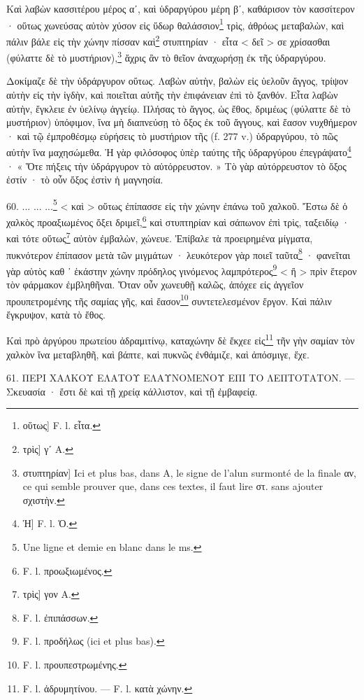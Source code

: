 \documentclass[a4paper, 11pt, oneside, polutonikogreek, french]{article}
\begin{document}
Καὶ λαβὼν κασσιτέρου μέρος αʹ, καὶ ὑδραργύρου μέρη βʹ, καθάρισον τὸν κασσίτερον · οὕτως χωνεύσας αὐτὸν χύσον εἰς ὕδωρ θαλάσσιον\footnote{οὕτως] F. l. εἶτα.} τρὶς, ἀθρόως μεταβαλὼν, καὶ πάλιν βάλε εἰς τὴν χώνην πίσσαν καὶ\footnote{τρὶς] γʹ A.} στυπτηρίαν · εἶτα < δεῖ > σε χρίσασθαι (φύλαττε δὲ τὸ μυστήριον),\footnote{στυπτηρίαν] Ici et plus bas, dans A, le signe de l'alun surmonté de la finale αν, ce qui semble prouver que, dans ces textes, il faut lire στ. sans ajouter σχιστὴν.} ἄχρις ἂν τὸ θεῖον ἀναχωρήσῃ ἐκ τῆς ὑδραργύρου.

Δοκίμαζε δὲ τὴν ὑδράργυρον οὕτως. Λαβὼν αὐτὴν, βαλὼν εἰς ὑελοῦν ἄγγος, τρίψον αὐτὴν εἰς τὴν ἰγδὴν, καὶ ποιεῖται αὐτῆς τὴν ἐπιφάνειαν ἐπὶ τὸ ξανθόν. Εἶτα λαβὼν αὐτὴν, ἔγκλειε ἐν ὑελίνῳ ἀγγείῳ. Πλήσας τὸ ἄγγος, ὡς ἔθος, δριμέως (φύλαττε δὲ τὸ μυστήριον) ὑπόφιμον, ἵνα μὴ διαπνεύσῃ τὸ ὄξος ἐκ τοῦ ἄγγους, καὶ ἔασον νυχθήμερον · καὶ τῷ ἐμπροθέσμῳ εὑρήσεις τὸ μυστήριον τῆς (f. 277 v.) ὑδραργύρου, τὸ πῶς αὐτὴν ἵνα μαχησώμεθα. Ἡ γὰρ φιλόσοφος ὑπὲρ ταύτης τῆς ὑδραργύρου ἐπεγράψατο\footnote{Ἡ] F. l. Ὁ.} · « Ὅτε πήξεις τὴν ὑδράργυρον τὸ αὐτόρρευστον. » Τὸ γὰρ αὐτόρρευστον τὸ ὄξος ἐστίν · τὸ οὖν ὄξος ἐστὶν ἡ μαγνησία.

60. ... ... ...\footnote{Une ligne et demie en blanc dans le ms.} < καὶ > οὕτως ἐπίπασσε εἰς τὴν χώνην ἐπάνω τοῦ χαλκοῦ. Ἔστω δὲ ὁ χαλκὸς προαξιωμένος ὄξει δριμεῖ,\footnote{F. l. προωξιωμένος.} καὶ στυπτηρίαν καὶ σάπωνον ἐπὶ τρὶς, ταξειδίῳ · καὶ τότε οὕτως\footnote{τρὶς] γον A.} αὐτὸν ἐμβαλὼν, χώνευε. Ἐπίβαλε τὰ προειρημένα μίγματα, πυκνότερον ἐπίπασον μετὰ τῶν μιγμάτων · λευκότερον γὰρ ποιεῖ ταῦτα\footnote{F. l. ἐπιπάσσων.} · φανεῖται γὰρ αὐτὸς καθ ᾽ ἑκάστην χώνην πρόδηλος γινόμενος λαμπρότερος\footnote{F. l. προδήλως (ici et plus bas).} < ἢ > πρὶν ἕτερον τὸν φάρμακον ἐμβληθῆναι. Ὅταν οὖν χωνευθῇ καλῶς, ἀπόχεε εἰς ἀγγεῖον προυπετρομένης τῆς σαμίας γῆς, καὶ ἔασον\footnote{F. l. προυπεστρωμένης.} συντετελεσμένον ἔργον. Καὶ πάλιν ἔγκρυψον, κατὰ τὸ ἔθος.

Καὶ πρὸ ἀργύρου πρωτείου ἀδραμιτίνῳ, καταχώνην δὲ ἔκχεε εἰς\footnote{F. l. ἀδρυμητίνου. --- F. l. κατὰ χώνην.} τῆν γὴν σαμίαν τὸν χαλκὸν ἵνα μεταβληθῆ, καὶ βάπτε, καὶ πυκνῶς ἐνθάμιζε, καὶ ἀπόσμιγε, ἔχε.

61. ΠΕΡΙ ΧΑΛΚΟΥ ΕΛΑΤΟΥ ΕΛΑΥΝΟΜΕΝΟΥ ΕΠΙ ΤΟ ΛΕΠΤΟΤΑΤΟΝ. --- Σκευασία · ἔστι δὲ καὶ τῇ χρείᾳ κάλλιστον, καὶ τῇ ἐμβαφείᾳ.
\end{document}
